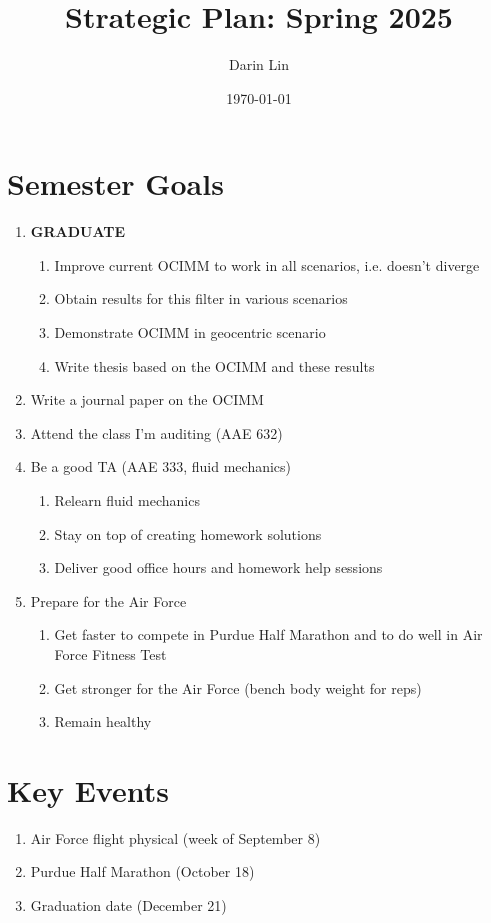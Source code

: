 \documentclass{article}
\title{Strategic Plan: Spring 2025}
\author{Darin Lin}
\date{\today}
\begin{document}
\maketitle

\section{Semester Goals}

\begin{enumerate}
    \item \textbf{GRADUATE}
    \begin{enumerate}
        \item Improve current OCIMM to work in all scenarios, i.e. doesn't diverge
        \item Obtain results for this filter in various scenarios
        \item Demonstrate OCIMM in geocentric scenario
        \item Write thesis based on the OCIMM and these results
    \end{enumerate}
    \item Write a journal paper on the OCIMM
    \item Attend the class I'm auditing (AAE 632)
    \item Be a good TA (AAE 333, fluid mechanics)
    \begin{enumerate}
        \item Relearn fluid mechanics
        \item Stay on top of creating homework solutions
        \item Deliver good office hours and homework help sessions
    \end{enumerate}
    \item Prepare for the Air Force
    \begin{enumerate}
        \item Get faster to compete in Purdue Half Marathon and to do well in Air Force Fitness Test
        \item Get stronger for the Air Force (bench body weight for reps)
        \item Remain healthy
    \end{enumerate}
\end{enumerate}

\section{Key Events}
\begin{enumerate}
    \item Air Force flight physical (week of September 8)
    \item Purdue Half Marathon (October 18)
    \item Graduation date (December 21)
\end{enumerate}
\end{document}
